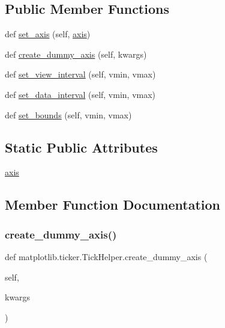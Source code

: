 \subsection*{Public Member Functions}
\begin{DoxyCompactItemize}
\item 
def \hyperlink{classmatplotlib_1_1ticker_1_1TickHelper_af58e707e64fe175c4e25420770d0c0b7}{set\+\_\+axis} (self, \hyperlink{classmatplotlib_1_1ticker_1_1TickHelper_a22c5bc260545f95f9674da1311e8a0d9}{axis})
\item 
def \hyperlink{classmatplotlib_1_1ticker_1_1TickHelper_adeae8abbff3fe038721864ac3af881fb}{create\+\_\+dummy\+\_\+axis} (self, kwargs)
\item 
def \hyperlink{classmatplotlib_1_1ticker_1_1TickHelper_aa0fb841221fd01682835108e6c177b7a}{set\+\_\+view\+\_\+interval} (self, vmin, vmax)
\item 
def \hyperlink{classmatplotlib_1_1ticker_1_1TickHelper_a1b8af1051ec10c0b2c06a5fdc7ca98d6}{set\+\_\+data\+\_\+interval} (self, vmin, vmax)
\item 
def \hyperlink{classmatplotlib_1_1ticker_1_1TickHelper_a920809a42f1d50ec09f896089fc8eac2}{set\+\_\+bounds} (self, vmin, vmax)
\end{DoxyCompactItemize}
\subsection*{Static Public Attributes}
\begin{DoxyCompactItemize}
\item 
\hyperlink{classmatplotlib_1_1ticker_1_1TickHelper_a22c5bc260545f95f9674da1311e8a0d9}{axis}
\end{DoxyCompactItemize}


\subsection{Member Function Documentation}
\mbox{\label{classmatplotlib_1_1ticker_1_1TickHelper_adeae8abbff3fe038721864ac3af881fb}} 
\subsubsection{\texorpdfstring{create\+\_\+dummy\+\_\+axis()}{create\_dummy\_axis()}}
{\footnotesize\ttfamily def matplotlib.\+ticker.\+Tick\+Helper.\+create\+\_\+dummy\+\_\+axis (\begin{DoxyParamCaption}\item[{}]{self,  }\item[{}]{kwargs }\end{DoxyParamCaption})}

